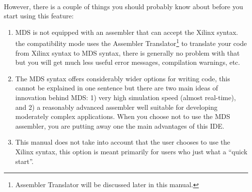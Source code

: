     ~\\However, there is a couple of things you should probably know about before you start using this feature:
    \begin{enumerate}
        \item MDS is not equipped with an assembler that can accept the Xilinx syntax. the compatibility mode uses the Assembler Translator\footnote{Assembler Translator will be discussed later in this manual.} to translate your code from Xilinx syntax to MDS syntax, there is generally no problem with that but you will get much less useful error messages, compilation warnings, etc.
        \item The MDS syntax offers considerably wider options for writing code, this cannot be explained in one sentence but there are two main ideas of innovation behind MDS: 1) very high simulation speed (almost real-time), and 2) a reasonably advanced assembler well suitable for developing moderately complex applications. When you choose not to use the MDS assembler, you are putting away one the main advantages of this IDE.
        \item This manual does not take into account that the user chooses to use the Xilinx syntax, this option is meant primarily for users who just what a ``quick start''.
    \end{enumerate}
